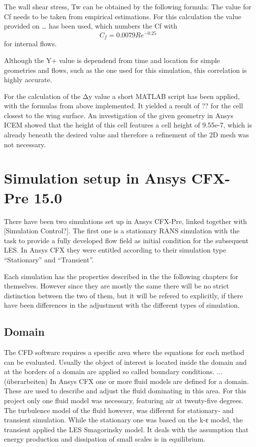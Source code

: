 The wall shear stress, Tw can be obtained by the following formula:
The value for Cf needs to be taken from empirical estimations. For this calculation the value provided on … has been used, which numbers the Cf with
\begin{equation}
C_f = 0.0079 Re^{-0.25}
\end{equation}
for internal flows.

Although the Y+ value is dependend from time and location for simple geometries and flows, such as the one used for this simulation, this correlation is highly accurate.

For the calculation of the Δy value a short MATLAB script has been applied, with the formulas from above implemented. It yielded a result of ?? for the cell closest to the wing surface. An investigation of the given geometry in Ansys ICEM showed that the height of this cell features a cell height of 9.55e-7, which is already beneath the desired value and therefore a refinement of the 2D mesh was not necessary. 
\section{Simulation setup in Ansys CFX-Pre 15.0}
There have been two simulations set up in Ansys CFX-Pre, linked together with [Simulation Control?]. The first one is a stationary RANS simulation with the task to provide a fully developed flow field as initial condition for the subsequent LES. In Ansys CFX they were entitled according to their simulation type ``Stationary'' and ``Transient''.

Each simulation has the properties described in the the following chapters for themselves. However since they are mostly the same there will be no strict distinction between the two of them, but it will be refered to explicitly, if there have been differences in the adjustment with the different types of simulation.
\subsection{Domain}
The CFD software requires a specific area where the equations for each method can be evaluated. Usually the object of interest is located inside the domain and at the borders of a domain are applied so called boundary conditions. ... (überarbeiten)
In Ansys CFX one or more fluid models are defined for a domain. These are used to describe and adjust the fluid dominating in this area. For this project only one fluid model was necessary, featuring air at twenty-five degrees.
The turbulence model of the fluid however, was different for stationary- and transient simulation. While the stationary one was based on the k-ε model, the transient applied the LES Smagorinsky model. It deals with the assumption that energy production and dissipation of small scales is in equilibrium.
